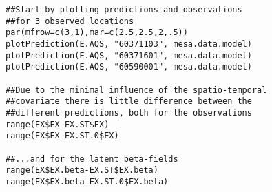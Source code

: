 \vspace*{-0.5\baselineskip}
\begin{verbatim}
##Start by plotting predictions and observations 
##for 3 observed locations
par(mfrow=c(3,1),mar=c(2.5,2.5,2,.5))
plotPrediction(E.AQS, "60371103", mesa.data.model)
plotPrediction(E.AQS, "60371601", mesa.data.model)
plotPrediction(E.AQS, "60590001", mesa.data.model)

##Due to the minimal influence of the spatio-temporal 
##covariate there is little difference between the 
##different predictions, both for the observations
range(EX$EX-EX.ST$EX)
range(EX$EX-EX.ST.0$EX)

##...and for the latent beta-fields
range(EX$EX.beta-EX.ST$EX.beta)
range(EX$EX.beta-EX.ST.0$EX.beta)
\end{verbatim}
